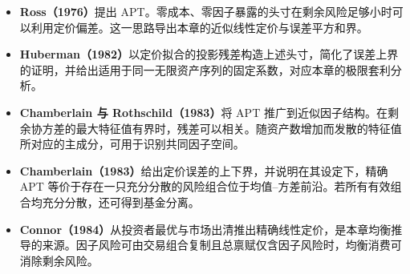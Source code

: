 \begin{tcolorbox}[knowledge,breakable=false,title={参考文献与本章贡献}]
\begin{itemize}
 \item \textbf{Ross（1976）}提出 APT。零成本、零因子暴露的头寸在剩余风险足够小时可以利用定价偏差。这一思路导出本章的近似线性定价与误差平方和界。
 \item \textbf{Huberman（1982）}以定价拟合的投影残差构造上述头寸，简化了误差上界的证明，并给出适用于同一无限资产序列的固定系数，对应本章的极限套利分析。
 \item \textbf{Chamberlain 与 Rothschild（1983）}将 APT 推广到近似因子结构。在剩余协方差的最大特征值有界时，残差可以相关。随资产数增加而发散的特征值所对应的主成分，可用于识别共同因子空间。
 \item \textbf{Chamberlain（1983）}给出定价误差的上下界，并说明在其设定下，精确 APT 等价于存在一只充分分散的风险组合位于均值--方差前沿。若所有有效组合均充分分散，还可得到基金分离。
 \item \textbf{Connor（1984）}从投资者最优与市场出清推出精确线性定价，是本章均衡推导的来源。因子风险可由交易组合复制且总禀赋仅含因子风险时，均衡消费可消除剩余风险。
\end{itemize}
\end{tcolorbox}
\fi
\WJChapterExercises

\endgroup
